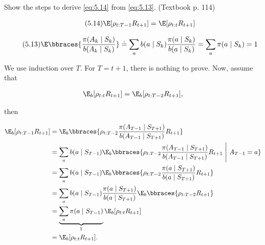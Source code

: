 
\begin{exercise}[Exercise 5.13]

Show the steps to derive \eqref{eq:5.14} from \eqref{eq:5.13}.
(Textbook p. 114)

\end{exercise}


\begin{solution}

\begin{align} \label{eq:5.14} \tag{5.14}
    \E[\rho_{t:T-1} R_{t+1}]
    =
    \E[\rho_{t:t} R_{t+1}]
\end{align}

\begin{align} \label{eq:5.13} \tag{5.13}
    \E
    \bbraces
    {
        \frac{\pi(A_k \mid S_k)}{b(A_k \mid S_k)}
    }
    \doteq
    \sum_a
        b(a \mid S_k)
        \frac{\pi(a \mid S_k)}{b(a \mid S_k)}
    =
    \sum_a
        \pi(a \mid S_k)
    =
    1
\end{align}

We use induction over $T$.
For $T = t+1$, there is nothing to prove.
Now, assume that

\begin{align*}
    \E_b[\rho_{t:t} R_{t+1}]
    =
    \E_b[\rho_{t:T-2} R_{t+1}],
\end{align*}

then

\begin{align*}
    \E_b[\rho_{t:T-1} R_{t+1}]
    & =
    \E_b
    \bbraces
    {
        \rho_{t:T-2}
        \frac{\pi(A_{T-1} \mid S_{T+1})}{b(A_{T-1} \mid S_{T+1})}
        R_{t+1}
    } \\
    & =
    \sum_a
        b(a \mid S_{T-1})
        \E_b
        \bbraces
        {
            \rho_{t:T-2}
            \frac{\pi(A_{T-1} \mid S_{T+1})}{b(A_{T-1} \mid S_{T+1})}
            R_{t+1}
            ~ \Bigg | ~
            A_{T-1} = a
        } \\
        & =
        \sum_a
            b(a \mid S_{T-1})
            \E_b
            \bbraces
            {
                \rho_{t:T-2}
                \frac{\pi(a \mid S_{T+1})}{b(a \mid S_{T+1})}
                R_{t+1}
            } \\            
        & =
        \sum_a
            b(a \mid S_{T-1})
            \frac{\pi(a \mid S_{T+1})}{b(a \mid S_{T+1})}
            \E_b
            \bbraces
            {
                \rho_{t:T-2}
                R_{t+1}
            } \\
        & =
        \underbrace
        {
            \sum_a
                \pi(a \mid S_{T-1})
        }_1
        \E_b[\rho_{t:t} R_{t+1}] \\
        & =
        \E_b[\rho_{t:t} R_{t+1}].
\end{align*}

\end{solution}

